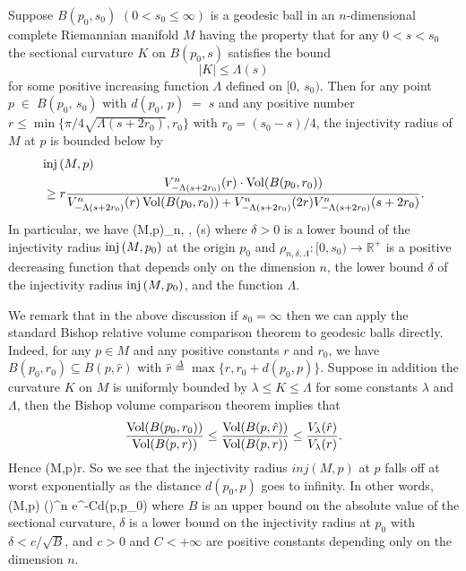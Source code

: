 \begin{corollary}
  \label{cor:cz-injectivity-radius-from-local-curvature-scale}
Suppose $B(p_0, s_0)$ $(0<s_0\le \infty)$ is a geodesic ball in an
$n$-dimensional complete Riemannian manifold $M$ having the
property that for any $0<s<s_0$ the sectional curvature $K$ on
$B(p_0, s)$ satisfies the bound
$$
|K|\le \Lambda(s)
$$
for\; some\; positive\; increasing\; function\; $\Lambda$\;
defined\; on\; $[0,\,s_0)$.\; Then\; for\; any\; point\; $p\;\in\;
B(p_0,\, s_0)$\; with\; $d(p_0,\, p)\;=\;s$\; and\; any\;
positive\; number $r\le \min\{\pi/4\sqrt{\Lambda(s+2r_0)},r_0\}$
with $r_0=(s_0-s)/4$, the injectivity radius of $M$ at $p$ is
bounded below by
\begin{align*}
& {\rm inj}\,(M,p) \\
&\geq r \frac{V^{n}_{-\Lambda(s+2r_0)}(r)\cdot
\operatorname{Vol}(B(p_0,r_0))}{V^{n}_{-\Lambda(s+2r_0)}(r)\operatorname{Vol}(B(p_0,r_0))+
V_{-\Lambda(s+2r_0)}^n(2r)V^{n}_{-\Lambda(s+2r_0)}(s+2r_0)}.
\end{align*}
In particular, we have \be
\inj(M,p)\geq \rho_{n, \delta, \Lambda}(s) %
\ee where $\delta>0$ is a lower bound of the injectivity radius
${\rm inj}\,(M, p_0)$ at the origin $p_0$ and $\rho_{n,\delta, \Lambda}:
[0, s_0) \to \mathbb{R^+}$ is a positive decreasing function that
depends only on the dimension $n$, the lower bound $\delta$ of the
injectivity radius ${\rm inj}\,(M,p_0)$, and the function $\Lambda$.
\end{corollary}

We remark that in the above discussion if $s_0=\infty$ then we can
apply the standard Bishop relative volume comparison theorem to
geodesic balls directly. Indeed, for any $p\in M$ and any positive
constants $r$ and $r_0$, we have $B(p_0, r_0)\subseteq B(p,
\hat{r})$ with
$\hat{r}\stackrel{\Delta}{=}\max\{r,r_0+d(p_0,p)\}$. Suppose in
addition the curvature $K$ on $M$ is uniformly bounded by
$\lambda\le K\le\Lambda$ for some constants $\lambda$ and
$\Lambda$, then the Bishop volume comparison theorem implies that
$$
\frac{\operatorname{Vol}(B(p_0,r_0))}{\operatorname{Vol}(B(p,r))}\le
\frac{\operatorname{Vol}(B(p,\hat{r}))}{\operatorname{Vol}(B(p,r))}\le
\frac{V_{\lambda}(\hat{r})}{V_{\lambda}(r)}.$$ Hence \be
\inj(M,p)\geq r. %
\ee So we see that the injectivity radius $inj(M,p)$ at $p$ falls
off at worst exponentially as the distance $d(p_0,p)$ goes to
infinity. In other words, \be \inj(M,p)\geq
{}(\delta {})^n
e^{-Cd(p,p_0)} %
\ee where $B$ is an upper bound on the absolute value of the
sectional curvature, $\delta$ is a lower bound on the injectivity
radius at $p_0$ with $\delta<c/\sqrt{B}$, and $c>0$ and $C<+\infty
$ are positive constants depending only on the dimension $n$.

